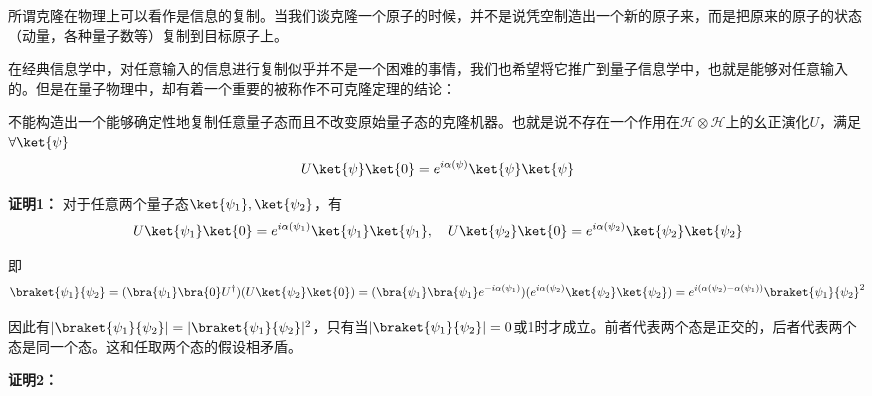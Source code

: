 
所谓克隆在物理上可以看作是信息的复制。当我们谈克隆一个原子的时候，并不是说凭空制造出一个新的原子来，而是把原来的原子的状态（动量，各种量子数等）复制到目标原子上。

在经典信息学中，对任意输入的信息进行复制似乎并不是一个困难的事情，我们也希望将它推广到量子信息学中，也就是能够对任意输入的。但是在量子物理中，却有着一个重要的被称作不可克隆定理的结论：
\begin{theorem}{}
不能构造出一个能够确定性地复制任意量子态而且不改变原始量子态的克隆机器。也就是说不存在一个作用在$\mathcal{H}\otimes\mathcal{H}$上的幺正演化$U$，满足$\forall\ket{\psi}$
\begin{equation}
U\ket{\psi}\ket{0}=e^{i\alpha(\psi)}\ket{\psi}\ket{\psi}
\end{equation}
\end{theorem}

\textbf{证明1：}
对于任意两个量子态$\ket{\psi_1},\ket{\psi_2}$，有\begin{equation}
 U\ket{\psi_1}\ket{0}=e^{i\alpha(\psi_1)}\ket{\psi_1}\ket{\psi_1},\quad U\ket{\psi_2}\ket{0}=e^{i\alpha(\psi_2)}\ket{\psi_2}\ket{\psi_2}
\end{equation}

即\begin{equation}
\braket{\psi_1}{\psi_2}=(\bra{\psi_1}\bra{0}U^\dagger)(U\ket{\psi_2}\ket{0})=(\bra{\psi_1}\bra{\psi_1}e^{-i\alpha(\psi_1)})(e^{i\alpha(\psi_2)}\ket{\psi_2}\ket{\psi_2})=e^{i(\alpha(\psi_2)-\alpha(\psi_1))}\braket{\psi_1}{\psi_2}^2
\end{equation}

因此有$|\braket{\psi_1}{\psi_2}|=|\braket{\psi_1}{\psi_2}|^2$，只有当$|\braket{\psi_1}{\psi_2}|=0$或1时才成立。前者代表两个态是正交的，后者代表两个态是同一个态。这和任取两个态的假设相矛盾。

\textbf{证明2：}



